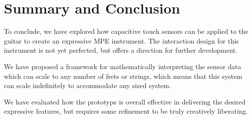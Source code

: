\section{Summary and Conclusion}

To conclude, we have explored how capacitive touch sensors can be applied to the guitar to create an expressive MPE instrument. The interaction design for this instrument is not yet perfected, but offers a direction for further development.

We have proposed a framework for mathematically interpreting the sensor data which can scale to any number of frets or strings, which means that this system can scale indefinitely to accommodate any sized system.

We have evaluated how the prototype is overall effective in delivering the desired expressive features, but requires some refinement to be truly creatively liberating. 

